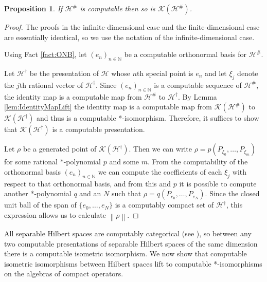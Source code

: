 \documentclass{amsart}
\newcommand{\norm}[1]{\left\| #1 \right\|}
\theoremstyle{plain}
\newtheorem{proposition}[theorem]{Proposition}
\theoremstyle{definition}
\numberwithin{equation}{section}
\begin{document}
\begin{proposition}\label{prop:PresentationOfCompacts}
If $\mathcal{H}^\#$ is computable then so is $\mathcal{K}(\mathcal{H}^\#)$.
\end{proposition}
\begin{proof}
The proofs in the infinite-dimensional case and the finite-dimensional case are essentially identical, so we use the notation of the infinite-dimensional case.

Using Fact \ref{fact:ONB}, let $(e_n)_{n \in \mathbb{N}}$ be a computable orthonormal basis for $\mathcal{H}^\#$.  

Let $\mathcal{H}^\dagger$ be the presentation of $\mathcal{H}$ whose $n$th special point is $e_n$ and let $\xi_j$ denote the $j$th rational vector of $\mathcal{H}^\dagger$.  Since $(e_n)_{n\in\mathbb{N}}$ is a computable sequence of $\mathcal{H}^\#$, the identity map is a computable map from $\mathcal{H}^\#$ to $\mathcal{H}^\dagger$.  By Lemma \ref{lem:IdentityMapLift} the identity map is a computable map from $\mathcal{K}(\mathcal{H}^\#)$ to $\mathcal{K}(\mathcal{H}^\dagger)$ and thus is a computable *-isomorphism. Therefore, it suffices to show that $\mathcal{K}(\mathcal{H}^\dagger)$ is a computable presentation.

Let $\rho$ be a generated point of $\mathcal{K}(\mathcal{H}^\dagger)$.  Then we can write $\rho = p(P_{\xi_0}, \ldots, P_{\xi_m})$ for some rational $*$-polynomial $p$ and some $m$.  From the computability of the orthonormal basis $(e_n)_{n \in \mathbb{N}}$ we can compute the coefficients of each $\xi_j$ with respect to that orthonormal basis, and from this and $p$ it is possible to compute another *-polynomial $q$ and an $N$ such that $\rho = q(P_{e_0}, \ldots, P_{e_N})$.  Since the closed unit ball of the span of $\{e_0, \ldots, e_N\}$ is a computably compact set of $\mathcal{H}^\dagger$, this expression allows us to calculate $\norm{\rho}$.
\end{proof}

All separable Hilbert spaces are computably categorical (see \cite[Corollary 3.7]{BrattkaYoshikawa}), so between any two computable presentations of separable Hilbert spaces of the same dimension there is a computable isometric isomorphism.  We now show that computable isometric isomorphisms between Hilbert spaces lift to computable *-isomorphisms on the algebras of compact operators.
\end{document}
